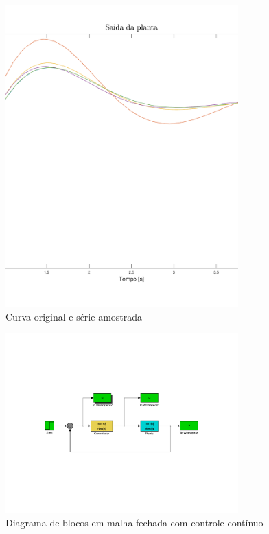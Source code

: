     \begin{figure}[H]
	\center
	\includegraphics[width=0.8\textwidth]{images/errozoh.pdf}
	\caption{Curva original e série amostrada}
	\label{fig:ex6erro}
    \end{figure}
    
    \begin{figure}[H]
	\center
	\includegraphics[width=0.8\textwidth]{images/ex6simcontinuo.pdf}
	\caption{Diagrama de blocos em malha fechada com controle contínuo}
	\label{fig:ex6continuo}
    \end{figure}

